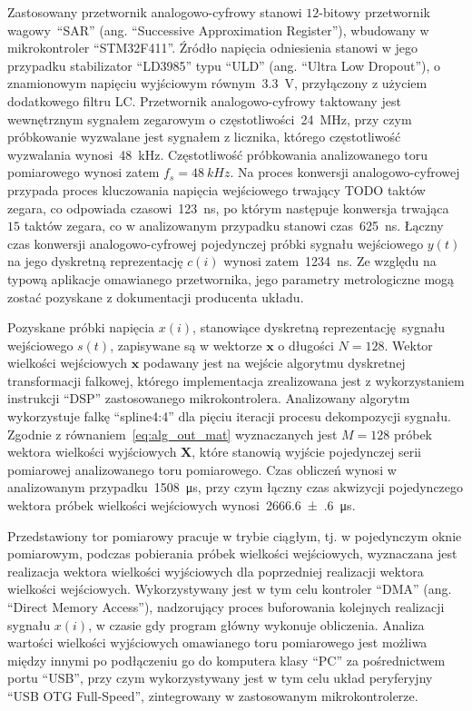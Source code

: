 Zastosowany przetwornik analogowo-cyfrowy stanowi $12$-bitowy przetwornik wagowy~\enquote{SAR} (ang. \enquote{Successive Approximation Register}), wbudowany w mikrokontroler \enquote{STM32F411}. Źródło napięcia odniesienia stanowi w jego przypadku stabilizator \enquote{LD3985} typu \enquote{ULD} (ang. \enquote{Ultra Low Dropout}), o znamionowym napięciu wyjściowym równym~\qty{3.3}{V}, przyłączony z użyciem dodatkowego filtru LC. Przetwornik analogowo-cyfrowy taktowany jest wewnętrznym sygnałem zegarowym o częstotliwości~\qty{24}{MHz}, przy czym próbkowanie wyzwalane jest sygnałem z licznika, którego częstotliwość wyzwalania wynosi~\qty{48}{kHz}. Częstotliwość próbkowania analizowanego toru pomiarowego wynosi zatem $f_{s} = \qty{48}{kHz}$. Na proces konwersji analogowo-cyfrowej przypada proces kluczowania napięcia wejściowego trwający TODO taktów zegara, co odpowiada czasowi~\qty{123}{ns}, po którym następuje konwersja trwająca $15$ taktów zegara, co w analizowanym przypadku stanowi czas~\qty{625}{ns}. Łączny czas konwersji analogowo-cyfrowej pojedynczej próbki sygnału wejściowego $y(t)$ na jego dyskretną reprezentację $c(i)$ wynosi zatem~\qty{1234}{ns}. Ze względu na typową aplikacje omawianego przetwornika, jego parametry metrologiczne mogą zostać pozyskane z dokumentacji producenta układu.

Pozyskane próbki napięcia $x(i)$, stanowiące dyskretną reprezentację sygnału wejściowego $s(t)$, zapisywane są w wektorze $\mathbf{x}$ o długości $N = 128$. Wektor wielkości wejściowych $\mathbf{x}$ podawany jest na wejście algorytmu dyskretnej transformacji falkowej, którego implementacja zrealizowana jest z wykorzystaniem instrukcji \enquote{DSP} zastosowanego mikrokontrolera. Analizowany algorytm wykorzystuje falkę \enquote{spline4:4} dla pięciu iteracji procesu dekompozycji sygnału. Zgodnie z równaniem~\eqref{eq:alg_out_mat} wyznaczanych jest $M = 128$ próbek wektora wielkości wyjściowych $\mathbf{X}$, które stanowią wyjście pojedynczej serii pomiarowej analizowanego toru pomiarowego. Czas obliczeń wynosi w analizowanym przypadku~\qty{1508}{\micro s}, przy czym łączny czas akwizycji pojedynczego wektora próbek wielkości wejściowych wynosi~\qty{2666.6(6)}{\micro s}.

Przedstawiony tor pomiarowy pracuje w trybie ciągłym, tj. w pojedynczym oknie pomiarowym, podczas pobierania próbek wielkości wejściowych, wyznaczana jest realizacja wektora wielkości wyjściowych dla poprzedniej realizacji wektora wielkości wejściowych. Wykorzystywany jest w tym celu kontroler \enquote{DMA} (ang. \enquote{Direct Memory Access}), nadzorujący proces buforowania kolejnych realizacji sygnału $x(i)$, w czasie gdy program główny wykonuje obliczenia. Analiza wartości wielkości wyjściowych omawianego toru pomiarowego jest możliwa między innymi po podłączeniu go do komputera klasy \enquote{PC} za pośrednictwem portu \enquote{USB}, przy czym wykorzystywany jest w tym celu układ peryferyjny \enquote{USB OTG Full-Speed}, zintegrowany w zastosowanym mikrokontrolerze.

